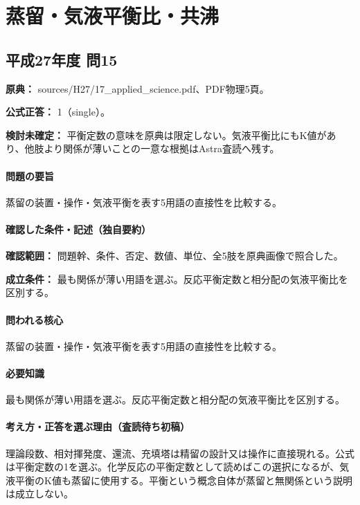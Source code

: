 \section{蒸留・気液平衡比・共沸}

\subsection{平成27年度 問15}
\label{q:h27-reg-applied-15}

\noindent\textbf{原典：} sources/H27/17\_applied\_science.pdf、PDF物理5頁。

\textbf{公式正答：} 1（single）。

\par\textbf{検討未確定：} 平衡定数の意味を原典は限定しない。気液平衡比にもK値があり、他肢より関係が薄いことの一意な根拠はAstra査読へ残す。

\paragraph{問題の要旨} 蒸留の装置・操作・気液平衡を表す5用語の直接性を比較する。

\paragraph{確認した条件・記述（独自要約）}\mbox{}\par

\noindent\textbf{確認範囲：} 問題幹、条件、否定、数値、単位、全5肢を原典画像で照合した。\par

\noindent\textbf{成立条件：} 最も関係が薄い用語を選ぶ。反応平衡定数と相分配の気液平衡比を区別する。\par

\paragraph{問われる核心} 蒸留の装置・操作・気液平衡を表す5用語の直接性を比較する。

\paragraph{必要知識} 最も関係が薄い用語を選ぶ。反応平衡定数と相分配の気液平衡比を区別する。

\paragraph{考え方・正答を選ぶ理由（査読待ち初稿）} 理論段数、相対揮発度、還流、充填塔は精留の設計又は操作に直接現れる。公式は平衡定数の1を選ぶ。化学反応の平衡定数として読めばこの選択になるが、気液平衡のK値も蒸留に使用する。平衡という概念自体が蒸留と無関係という説明は成立しない。

